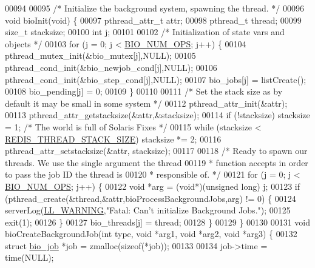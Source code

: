 \begin{DoxyCode}
00094 
00095 \textcolor{comment}{/* Initialize the background system, spawning the thread. */}
00096 \textcolor{keywordtype}{void} bioInit(\textcolor{keywordtype}{void}) \{
00097     pthread\_attr\_t attr;
00098     pthread\_t thread;
00099     size\_t stacksize;
00100     \textcolor{keywordtype}{int} j;
00101 
00102     \textcolor{comment}{/* Initialization of state vars and objects */}
00103     \textcolor{keywordflow}{for} (j = 0; j < \hyperlink{bio_8h_a544b0595052937cbb10e0ffd1f56d163}{BIO\_NUM\_OPS}; j++) \{
00104         pthread\_mutex\_init(&bio\_mutex[j],NULL);
00105         pthread\_cond\_init(&bio\_newjob\_cond[j],NULL);
00106         pthread\_cond\_init(&bio\_step\_cond[j],NULL);
00107         bio\_jobs[j] = listCreate();
00108         bio\_pending[j] = 0;
00109     \}
00110 
00111     \textcolor{comment}{/* Set the stack size as by default it may be small in some system */}
00112     pthread\_attr\_init(&attr);
00113     pthread\_attr\_getstacksize(&attr,&stacksize);
00114     \textcolor{keywordflow}{if} (!stacksize) stacksize = 1; \textcolor{comment}{/* The world is full of Solaris Fixes */}
00115     \textcolor{keywordflow}{while} (stacksize < \hyperlink{bio_8c_ac3dda970d0fb733f6938ca417e59556c}{REDIS\_THREAD\_STACK\_SIZE}) stacksize *= 2;
00116     pthread\_attr\_setstacksize(&attr, stacksize);
00117 
00118     \textcolor{comment}{/* Ready to spawn our threads. We use the single argument the thread}
00119 \textcolor{comment}{     * function accepts in order to pass the job ID the thread is}
00120 \textcolor{comment}{     * responsible of. */}
00121     \textcolor{keywordflow}{for} (j = 0; j < \hyperlink{bio_8h_a544b0595052937cbb10e0ffd1f56d163}{BIO\_NUM\_OPS}; j++) \{
00122         \textcolor{keywordtype}{void} *arg = (\textcolor{keywordtype}{void}*)(\textcolor{keywordtype}{unsigned} \textcolor{keywordtype}{long}) j;
00123         \textcolor{keywordflow}{if} (pthread\_create(&thread,&attr,bioProcessBackgroundJobs,arg) != 0) \{
00124             serverLog(\hyperlink{server_8h_a31229b9334bba7d6be2a72970967a14b}{LL\_WARNING},\textcolor{stringliteral}{"Fatal: Can't initialize Background Jobs."});
00125             exit(1);
00126         \}
00127         bio\_threads[j] = thread;
00128     \}
00129 \}
00130 
00131 \textcolor{keywordtype}{void} bioCreateBackgroundJob(\textcolor{keywordtype}{int} type, \textcolor{keywordtype}{void} *arg1, \textcolor{keywordtype}{void} *arg2, \textcolor{keywordtype}{void} *arg3) \{
00132     \textcolor{keyword}{struct} \hyperlink{structbio__job}{bio\_job} *job = zmalloc(\textcolor{keyword}{sizeof}(*job));
00133 
00134     job->time = time(NULL);

\end{DoxyCode}

